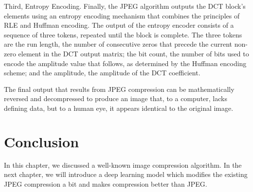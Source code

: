 Third, Entropy Encoding. Finally, the JPEG algorithm outputs the DCT block's elements using an entropy encoding mechanism that combines the principles of RLE and Huffman encoding. The output of the entropy encoder consists of a sequence of three tokens, repeated until the block is complete. The three tokens are the run length, the number of consecutive zeros that precede the current non-zero element in the DCT output matrix; the bit count, the number of bits used to encode the amplitude value that follows, as determined by the Huffman encoding scheme; and the amplitude, the amplitude of the DCT coefficient.

The final output that results from JPEG compression can be mathematically reversed and decompressed to produce an image that, to a computer, lacks defining data, but to a human eye, it appears identical to the original image.

\section{Conclusion}
In this chapter, we discussed a well-known image compression algorithm. In the next chapter, we will introduce a deep learning model which modifies the existing JPEG compression a bit and makes compression better than JPEG.